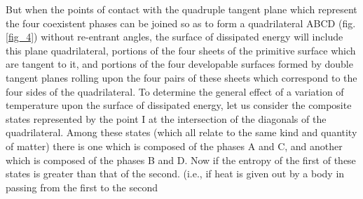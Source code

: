 \documentclass[12pt]{memoir}
\begin{document}
But when the points of contact with the quadruple tangent plane which represent the four coexistent phases can be joined so as to form a quadrilateral ABCD (fig. \ref{fig_4}) without re-entrant angles, the surface of dissipated energy will include this plane quadrilateral, portions of the four sheets of the primitive surface which are tangent to it, and portions of the four developable surfaces formed by double tangent planes rolling upon the four pairs of these sheets which correspond to the four sides of the quadrilateral. To determine the general effect of a variation of temperature upon the surface of dissipated energy, let us consider the composite states represented by the point I at the intersection of the diagonals of the quadrilateral. Among these states (which all relate to the same kind and quantity of matter) there is one which is composed of the phases A and C, and another which is composed of the phases B and D. Now if the entropy of the first of these states is greater than that of the second. (i.e., if heat is given out by a body in passing from the first to the second
\end{document}
